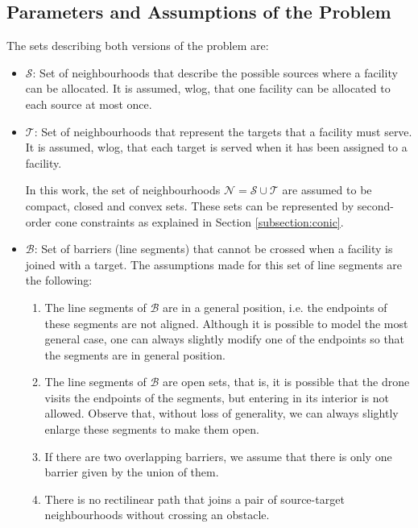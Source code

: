 \documentclass[a4paper,  review, authoryear, 1p.]{elsarticle}
\newcommand{\CV}[1]{{\color{blue}#1}}
\begin{document}
	\subsection{Parameters and Assumptions of the Problem}
	The sets describing both versions of the problem are:
	\begin{itemize}
		\item $\mathcal S$: Set of neighbourhoods that describe the possible sources where a facility can be allocated. It is assumed, wlog, that one facility can be allocated to each source at most once.
		\item $\mathcal T$: Set of neighbourhoods that represent the targets that a facility must serve. It is assumed, wlog, that each target is served when it has been assigned to a facility.
		
		\CV{In this work, the set of neighbourhoods $\mathcal N=\mathcal S\cup\mathcal T$ are assumed to be compact, closed and convex sets. These sets can be represented by second-order cone constraints as explained in Section \ref{subsection:conic}.}

		\item $\mathcal B$: Set of barriers (line segments) that cannot be crossed when a facility is joined with a target. The assumptions made for this set of line segments are the following:
		
		\begin{enumerate}[label=\textbf{A\arabic*},ref=\textbf{A\arabic*}]
			\item \label{A1}The line segments of $\mathcal B$ are in a general position, i.e. the endpoints of these segments are not aligned. Although it is possible to model the most general case, one can always slightly modify one of the endpoints so that the segments are in general position.
			\item The line segments of $\mathcal B$ are open sets, that is, it is possible that the drone visits the endpoints of the segments, but entering in its interior is not allowed. Observe that, without loss of generality, we can always slightly enlarge these segments to make them open.
			\item  If there are two overlapping barriers, we assume that there is only one barrier given by the union of them.
			\item \label{A4}There is no rectilinear path that joins a pair of source-target neighbourhoods without crossing an obstacle.
		\end{enumerate}
		
	\end{itemize}
	
\end{document}
